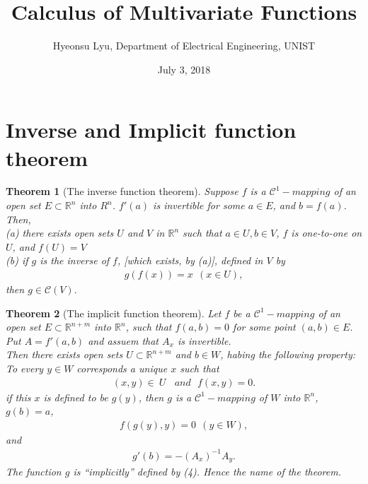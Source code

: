 \documentclass[a4paper,12pt]{article}
\theoremstyle{break}
\newtheorem{theorem}{Theorem}[section]
\begin{document}
\title{Calculus of Multivariate Functions}
\author{Hyeonsu Lyu, Department of Electrical Engineering, UNIST}
\date{July 3, 2018}
\maketitle

\section{Inverse and Implicit function theorem}
\begin{theorem} [The inverse function theorem] 
    \label{thm:InverseFunctionTheorem}
    Suppose $f$ is a $\mathcal{C}^1-mapping$ of an open set $E\subset \mathbb{R}^n$ into $R^n$. $f'(a)$ is invertible for some $a\in E$, and $b=f(a)$. Then,\\
    \indent (a)  there exists open sets $U$ and $V$ in $\mathbb{R}^n$ such that $a\in U, b\in V$, $f$ is one-to-one on $U$, and $f(U)=V$ \\
    \indent (b)  if $g$ is the inverse of $f$, [which exists, by (a)], defined in $V$ by
    \begin{align}
        g(f(x))=x\ \  (x\in U),
    \end{align}
    then $g\in \mathcal{C}(V).$
\end{theorem}

\begin{theorem} [The implicit function theorem]
    \label{thm:ImplicitFunctionTheorem}
    Let $f$ be a $\mathcal{C}^1-mapping$ of an open set $E\subset \mathbb{R}^{n+m}$ into $\mathbb{R}^n$, such that $f(a,b)=0$ for some point $(a,b)\in E$.\\
    \indent Put $A=f'(a,b)$ and assuem that $A_{\textit{x}}$ is invertible.\\
    \indent Then there exists open sets $U\subset \mathbb{R}^{n+m}$ and $b \in W$, habing the following property:\\
    \indent To every $y\in W$ corresponds a unique $x$ such that\\
    \begin{align}
        (x,y)\in\ U\ \ \ \ and \ \ \ f(x,y)=0.
    \end{align}
    \indent if this $x$ is defined to be $g(y)$, then $g$ is a $\mathcal{C}^1-mapping$ of $W$ into $\mathbb{R}^{n}$, $g(b)=a$,
    \begin{align}
        f(g(y),y)=0\ \ (y\in W),
    \end{align}
    \indent and
    \begin{align}
        g'(b)=-(A_x)^{-1}A_y.
    \end{align}
    \indent The function $g$ is “implicitly” defined by (4). Hence the name of the theorem.
\end{theorem}
\end{document}
